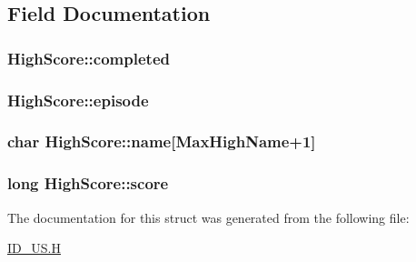 \subsection{Field Documentation}
\hypertarget{structHighScore_ac587b9632e80e9e9bfc58da8f7e7c718}{
\subsubsection[{completed}]{ {\bf HighScore::completed}}}
\label{structHighScore_ac587b9632e80e9e9bfc58da8f7e7c718}
\hypertarget{structHighScore_ab3194dca69b60b25ed50cfe60fa3ebd9}{
\subsubsection[{episode}]{ {\bf HighScore::episode}}}
\label{structHighScore_ab3194dca69b60b25ed50cfe60fa3ebd9}
\hypertarget{structHighScore_a6fa7a41b1508f9fb0b847c00b236f905}{
\subsubsection[{name}]{\setlength{\rightskip}{0pt plus 5cm}char {\bf HighScore::name}\mbox{[}MaxHighName+1\mbox{]}}}
\label{structHighScore_a6fa7a41b1508f9fb0b847c00b236f905}
\hypertarget{structHighScore_ac6e9240847382cb4b430acaf13cab5ec}{
\subsubsection[{score}]{\setlength{\rightskip}{0pt plus 5cm}long {\bf HighScore::score}}}
\label{structHighScore_ac6e9240847382cb4b430acaf13cab5ec}


The documentation for this struct was generated from the following file:\begin{DoxyCompactItemize}
\item 
\hyperlink{ID__US_8H}{ID\_\-US.H}\end{DoxyCompactItemize}
